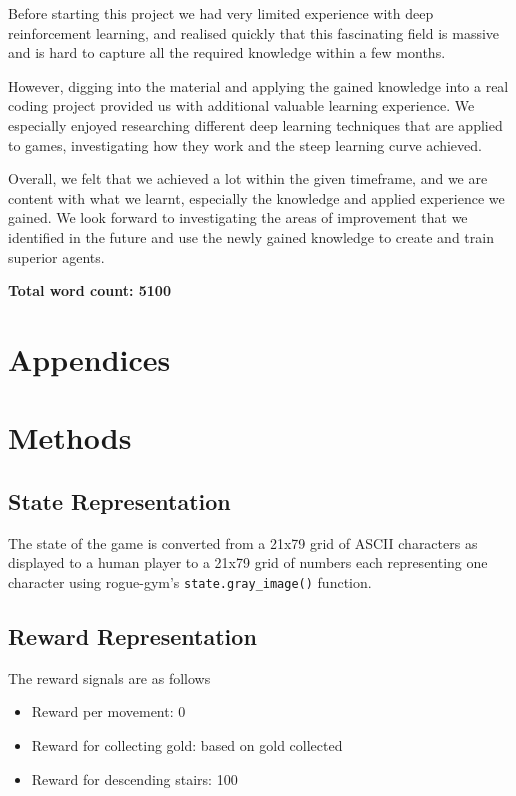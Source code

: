 \documentclass[12pt,a4paper]{article}
\begin{document}
    Before starting this project we had very limited experience with deep reinforcement learning, and realised
    quickly that this fascinating field is massive and is hard to capture all the required knowledge within a few months.

    However, digging into the material and applying the gained knowledge into a real coding project provided us with additional valuable
    learning experience.
    We especially enjoyed researching different deep learning techniques that are applied to games, investigating how they work and the steep learning curve achieved.

    Overall, we felt that we achieved a lot within the given timeframe, and we are content with what we learnt, especially
    the knowledge and applied experience we gained.
    We look forward to investigating the areas of improvement that we identified in the future and use the newly gained knowledge to create and train superior agents.



    \textbf{Total word count: 5100}
    \medskip

    
    

    \medskip

    \appendix
    \section*{Appendices}
    \section{Methods}\label{sec:methods}

    \subsection{State Representation}\label{subsec:state-representation}
    The state of the game is converted from a 21x79 grid of ASCII characters as displayed to a human player to a 21x79 grid of
    numbers each representing one character using rogue-gym's \texttt{state.gray\_image()} function.

    \subsection{Reward Representation}\label{subsec:reward-representation}
    The reward signals are as follows
    \begin{itemize}
        \item Reward per movement: 0
        \item Reward for collecting gold: based on gold collected
        \item Reward for descending stairs: 100
    \end{itemize}
\end{document}
